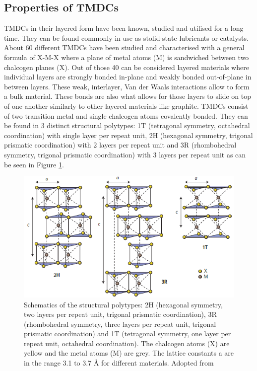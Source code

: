 \documentclass[12pt]{article}
\begin{document}
	\subsection{Properties of TMDCs}
	TMDCs in their layered form have been known, studied and utilised for a long time. They can be found commonly in use as stolid-state lubricants or catalysts. About 60 different TMDCs have been studied and characterised with a general formula of X-M-X where a plane of metal atoms (M) is sandwiched between two chalcogen planes (X). Out of those 40 can be considered layered materials where individual layers are strongly bonded in-plane and weakly bonded out-of-plane in between layers. These weak, interlayer, Van der Waals interactions allow to form a bulk material. These bonds are also what allows for those layers to slide on top of one another similarly to other layered materials like graphite. 
	TMDCs consist of two transition metal and single chalcogen atoms covalently bonded. They can be found in 3 distinct structural polytypes: 1T (tetragonal symmetry, octahedral coordination) with single layer per repeat unit, 2H (hexagonal symmetry, trigonal prismatic coordination) with 2 layers per repeat unit and 3R (rhombohedral symmetry, trigonal prismatic coordination) with 3 layers per repeat unit \cite{TMDCReviewNature2012} as can be seen in Figure \ref{fig:TMDCPolytypes}.
	
	\begin{figure}[h]
	\begin{center}
	\includegraphics[scale=0.7]{TMDCPolytypes.png}
	\caption{Schematics of the structural polytypes: 2H (hexagonal symmetry, two layers per repeat unit, trigonal prismatic coordination), 3R (rhombohedral symmetry, three layers per repeat unit, trigonal prismatic coordination) and 1T (tetragonal symmetry, one layer per repeat unit, octahedral coordination). The chalcogen atoms (X) are yellow and the metal atoms (M) are grey. The lattice constants a are in the range 3.1 to 3.7 Å for different materials. Adopted from \cite{TMDCReviewNature2012}}
	\label{fig:TMDCPolytypes}
	\end{center}
	\end{figure}
	
\end{document}
